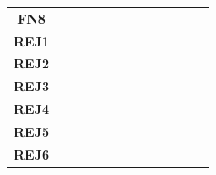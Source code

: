 \begin{table}
\begin{tabularx}{\textwidth}{ c *{12}{Y} }
    \textbf{FN8}  &                                   &                                       &                                         &                                           &                                        &                                         &             &            &             &            &             &            \\
    \textbf{REJ1} &                                   &                                       &                                         &                                           &                                        &                                         &             &            &             &            &             &            \\
    \textbf{REJ2} &                                   &                                       &                                         &                                           &                                        &                                         &             &            &             &            &             &            \\
    \textbf{REJ3} &                                   &                                       &                                         &                                           &                                        &                                         &             &            &             &            &             &            \\
    \textbf{REJ4} &                                   &                                       &                                         &                                           &                                        &                                         &             &            &             &            &             &            \\
    \textbf{REJ5} &                                   &                                       &                                         &                                           &                                        &                                         &             &            &             &            &             &            \\
    \textbf{REJ6} &                                   &                                       &                                         &                                           &                                        &                                         &             &            &             &            &             &            \\

\end{tabularx}
\end{table}
